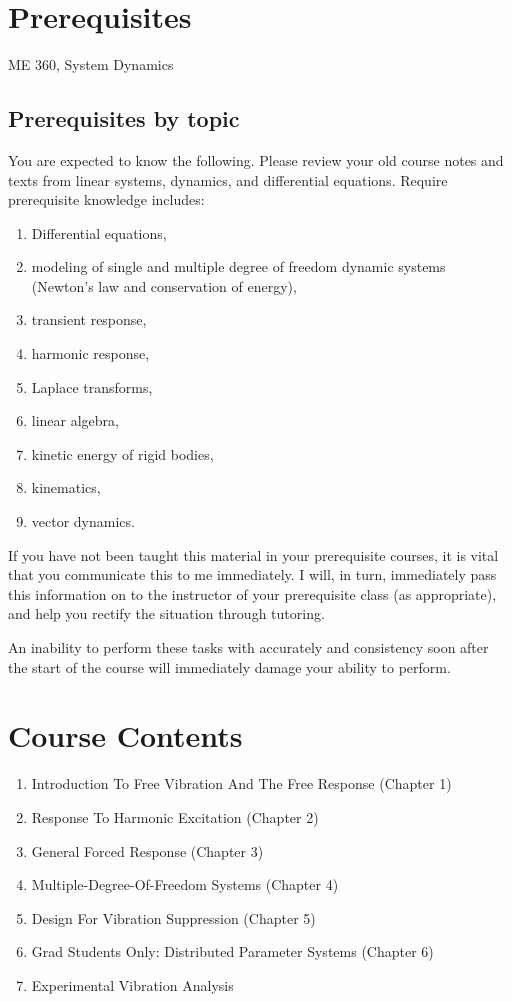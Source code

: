 \documentclass[10pt]{article}
\begin{document}
\section{Prerequisites}
ME 360, System Dynamics

\subsection{Prerequisites by topic}
\label{sec:prerequisites-topic}
You are expected to know the following.   Please review your old course notes and texts from linear systems, dynamics, and differential equations. Require prerequisite knowledge includes:
\begin{enumerate}\item 
  Differential equations,
\item modeling of single and multiple degree of
  freedom dynamic systems (Newton’s law and conservation of energy),
\item transient response,
\item harmonic response,
\item Laplace transforms,
\item linear
  algebra,
\item kinetic energy of rigid bodies,
\item kinematics,
\item vector
  dynamics.
\end{enumerate}


If you have not been taught this material in your prerequisite courses, it is vital that you communicate this to me immediately. I will, in turn, immediately pass this information on to the instructor of your prerequisite class (as appropriate), and help you rectify the situation through  tutoring. 

An inability to perform these tasks with accurately and consistency soon after the start of the course will immediately damage your ability to perform.



\section{Course Contents}
\begin{enumerate}
        \item Introduction To Free Vibration And The Free Response (Chapter 1)
        \item Response To Harmonic Excitation (Chapter 2)
        \item General Forced Response (Chapter 3)
        \item Multiple-Degree-Of-Freedom Systems (Chapter 4)
        \item Design For Vibration Suppression (Chapter 5)
        \item Grad Students Only: Distributed Parameter Systems (Chapter 6)
        \item Experimental Vibration Analysis
\end{enumerate}
\end{document}

